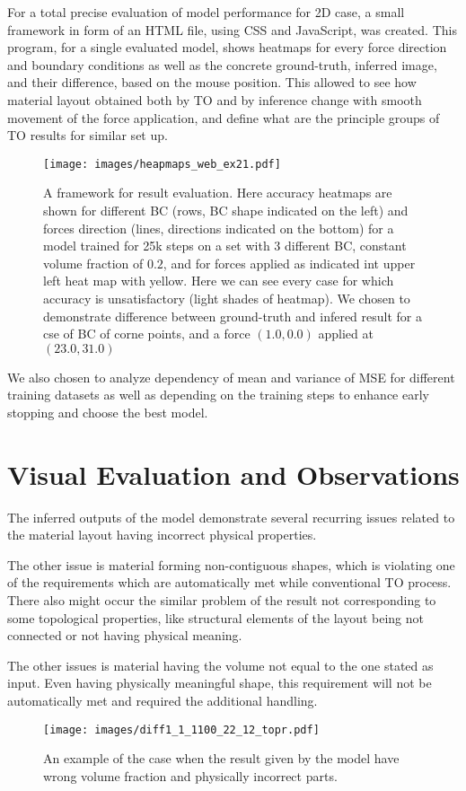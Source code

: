 For a total precise evaluation of model performance for 2D case, a small framework in form of an HTML file, using CSS and JavaScript, was created.
This program, for a single evaluated model, shows heatmaps for every force direction and boundary conditions as well as the concrete ground-truth, inferred image, and their difference, based on the mouse position.
This allowed to see how material layout obtained both by TO and by inference change with smooth movement of the force application, and define what are the principle groups of TO results for similar set up.
\begin{figure}[H]
	\centering
	\texttt{[image: images/heapmaps\_web\_ex21.pdf]}
	\caption{A framework for result evaluation. Here accuracy heatmaps are shown for different BC (rows, BC shape indicated on the left) and forces direction (lines, directions indicated on the bottom) for a model trained for 25k steps on a set with 3 different BC, constant volume fraction of $0.2$, and for forces applied as indicated int upper left heat map with yellow. Here we can see every case for which accuracy is unsatisfactory (light shades of heatmap). We chosen to demonstrate difference between ground-truth and infered result for a cse of BC of corne points, and a force $(1.0,0.0)$ applied at $(23.0,31.0)$ }
	\label{fig:to_flow}
\end{figure}
\medskip

We also chosen to analyze dependency of mean and variance of MSE for different training datasets as well as depending on the training steps to enhance early stopping and choose the best model.
\medskip

\section{Visual Evaluation and Observations}

The inferred outputs of the model demonstrate several recurring issues related to the material layout having incorrect physical properties.
\medskip

The other issue is material forming non-contiguous shapes, which is violating one of the requirements which are automatically met while conventional TO process.
There also might occur the similar problem of the result not corresponding to some topological properties, like structural elements of the layout being not connected or not having physical meaning. 
\medskip

The other issues is material having the volume not equal to the one stated as input.
Even having physically meaningful shape, this requirement will not be automatically met and required the additional handling.
\begin{figure}[h]
	\texttt{[image: images/diff1\_1\_1100\_22\_12\_topr.pdf]}
	\label{fig:element_cloudy_example}
	\caption{An example of the case when the result given by the model have wrong volume fraction and physically incorrect parts.}
\end{figure}
\medskip

